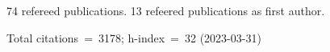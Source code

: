 74 refereed publications. 13 refeered publications as first author.

Total citations~=~3178; h-index~=~32 (2023-03-31)